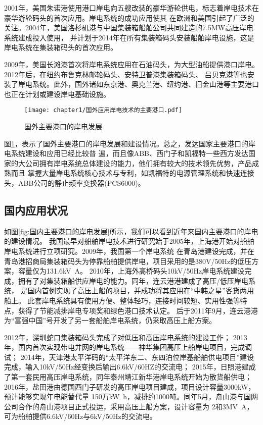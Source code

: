2001年，美国朱诺港使用港口岸电向五艘改装的豪华游轮供电，标志着岸电技术在豪华游轮码头的首次应用。岸电系统的成功应用使其
在欧洲和美国引起了广泛的关注。2004年，美国洛杉矶港与中国集装箱船舶公司共同建造的7.5\si{MW}高压岸电系统建成投入使用\cite{SP5}，
并计划于2014年在所有集装箱码头安装船舶岸电设施，这是岸电系统在集装箱码头的首次应用。

2009年，美国长滩港首次将岸电系统应用在石油码头，为大型油船提供港口岸电。2012年后，在纽约布鲁克林邮轮码头、安特卫普港集装箱码头、
吕贝克港等也安装了岸电系统。此外，国外诸如东京港、奥克兰港、纽约港、旧金山港等主要港口也正在计划或建设岸电基础设施\cite{SP6}。

\begin{figure}[!htp]
	\centering
	\texttt{[image: chapter1/国外应用岸电技术的主要港口.pdf]}
	\caption{国外主要港口的岸电发展}
	\label{fig:国外主要港口的岸电发展}
\end{figure}

图\ref{fig:国外主要港口的岸电发展}，表示了国外主要港口的岸电发展和建设情况。总之，发达国家主要港口的岸电系统建设和应用已经比较普
遍，而且像ABB、西门子和凯福特一些西方发达国家的大公司拥有岸电系统总体建设的能力，他们拥有较大的技术领先优势，产品成熟而且
掌握大量岸电系统核心技术与专利，如凯福特的电源管理系统和快速连接头，ABB公司的静止频率变换器(PCS6000)\cite{SP5}。

\subsection{国内应用状况}

如图\ref{fig:国内主要港口的岸电发展}所示，我们可以看到近年来国内主要港口的岸电的建设情况。
我国最早对船舶岸电技术进行研究始于2005年，上海港开始对船舶岸电系统进行立项研究。2009年，我国第一个岸电系统
在青岛港建设完成，并在青岛港招商局集装箱码头为停靠船舶提供岸电，项目采用的是380V/50Hz的低压方案，容量仅为131.6\si{kV.A}。
2010年，上海外高桥码头10kV/50Hz岸电系统建设完成，拥有了对集装箱船供应岸电的能力。同年，连云港港建成了高压/低压岸电系统，
是国内首例实现了高压上船的项目，并成功将其应用在“中韩之星”客货两用船上\cite{SP4}。
此套岸电系统具有使用方便、整体轻巧，连接时间较短、实用性强等特点，获得了节能减排岸电专项奖和绿色港口技术认定\cite{SP8}。
后于2011年9月，连云港港为“富强中国”号开发了另一套船舶岸电系统，仍采取高压上船方案。

2012年，深圳蛇口集装箱码头完成了对低压和高压岸电系统的建设工作；
2013年，国内首次实现带电并网的岸电系统——神华集团高压上船岸电项目，完成调试\cite{SP8}；
2014年，天津港太平洋码的“太平洋东二、东四泊位岸基船舶供电项目”建设完成，输入10kV/50Hz经变换后输出6.6kV/60HZ的交流电；
2015年，日照港建成了第一套民用高压岸电系统\cite{SP9}，同年泰州靖江新华港岸电系统开始为散货船供电；
2016年，盐田港由德国西门子研发的高压岸电项目建成，项目设计容量3000kW，预计能够实现年电能替代量
150万\si{kW.h}，减排约1000吨。同年5月，舟山港与国网公司合作的舟山港项目正式投运，采用高压上船方案，设计容量为
2和3\si{MV.A}，可为船舶提供6.6kV/60Hz与6kV/50Hz的交流电\cite{SP10}。

